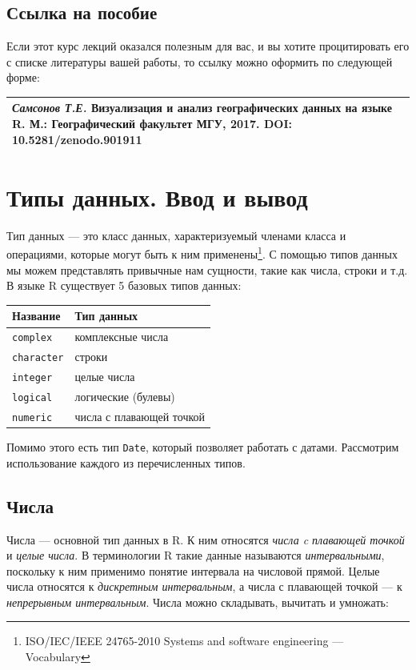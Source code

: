 \documentclass[]{book}
\let\rmarkdownfootnote\footnote%
\def\footnote{\protect\rmarkdownfootnote}
\begin{document}
\section*{Ссылка на пособие}\label{--}

Если этот курс лекций оказался полезным для вас, и вы хотите
процитировать его с списке литературы вашей работы, то ссылку можно
оформить по следующей форме:

\begin{longtable}[]{@{}l@{}}
\toprule
\emph{Самсонов Т.Е.} \textbf{Визуализация и анализ географических данных
на языке R.} М.: Географический факультет МГУ, 2017. DOI:
10.5281/zenodo.901911\tabularnewline
\bottomrule
\end{longtable}

\chapter{Типы данных. Ввод и вывод}\label{data_types}

Тип данных --- это класс данных, характеризуемый членами класса и
операциями, которые могут быть к ним применены\footnote{ISO/IEC/IEEE
  24765-2010 Systems and software engineering --- Vocabulary}. С помощью
типов данных мы можем представлять привычные нам сущности, такие как
числа, строки и т.д. В языке R существует 5 базовых типов данных:

\begin{longtable}[]{@{}ll@{}}
\toprule
Название & Тип данных\tabularnewline
\midrule
\endhead
\texttt{complex} & комплексные числа\tabularnewline
\texttt{character} & строки\tabularnewline
\texttt{integer} & целые числа\tabularnewline
\texttt{logical} & логические (булевы)\tabularnewline
\texttt{numeric} & числа с плавающей точкой\tabularnewline
\bottomrule
\end{longtable}

Помимо этого есть тип \texttt{Date}, который позволяет работать с
датами. Рассмотрим использование каждого из перечисленных типов.

\section{Числа}\label{numbers}

Числа --- основной тип данных в R. К ним относятся \emph{числа c
плавающей точкой} и \emph{целые числа}. В терминологии R такие данные
называются \emph{интервальными}, поскольку к ним применимо понятие
интервала на числовой прямой. Целые числа относятся к \emph{дискретным
интервальным}, а числа с плавающей точкой --- к \emph{непрерывным
интервальным}. Числа можно складывать, вычитать и умножать:
\end{document}
